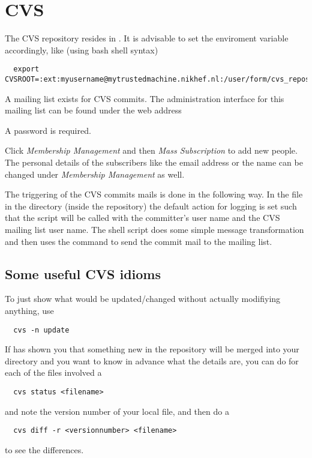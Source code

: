\section{CVS}

The CVS repository resides in . It is advisable to
set the enviroment variable  accordingly, like (using bash shell syntax)
{\scriptsize
\begin{verbatim}
  export CVSROOT=:ext:myusername@mytrustedmachine.nikhef.nl:/user/form/cvs_repository
\end{verbatim}}

A mailing list exists for CVS commits. The administration interface for this mailing list can be
found under the web address


A password is required. 

Click {\it Membership Management} and then {\it Mass Subscription} to add
new people. The personal details of the subscribers like the email address or
the name can be changed under {\it Membership Management} as well.

The triggering of the CVS commits mails is done in the following way. In the
file  in the directory  (inside the repository) the
default action for logging is set such that the script 
will be called with the committer's user name and the CVS mailing list user
name. The shell script does some simple message transformation and then uses the
command  to send the commit mail to the mailing list.

\subsection{Some useful CVS idioms}

To just show what would be updated/changed without actually
modifiying anything, use
\begin{verbatim}
  cvs -n update
\end{verbatim}

If  has shown you that something new in the repository will be
merged into your directory and you want to know in advance what the details are,
you can do for each of the files involved a
\begin{verbatim}
  cvs status <filename>
\end{verbatim}
and note the version number of your local file, and then do a
\begin{verbatim}
  cvs diff -r <versionnumber> <filename>
\end{verbatim}
to see the differences.

